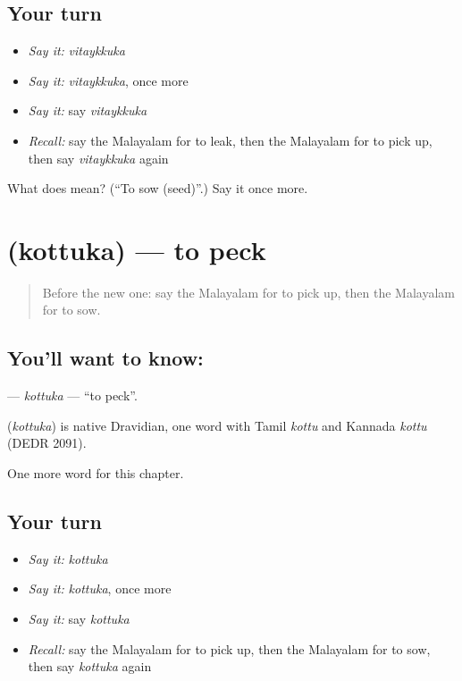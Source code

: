 \subsection*{Your turn}
\begin{itemize}
\raggedright
  \item \emph{Say it:} \emph{vitaykkuka}
  \item \emph{Say it:} \emph{vitaykkuka}, once more
  \item \emph{Say it:} say \emph{vitaykkuka}
  \item \emph{Recall:} say the Malayalam for to leak, then the Malayalam for to pick up, then say \emph{vitaykkuka} again
\end{itemize}

\begin{tcolorbox}[breakable,colback=teal!4,colframe=teal!35!black,title={Before you move on}]
What does  mean? (\textquotedblleft{}To sow (seed)\textquotedblright{}.) Say it once more.
\end{tcolorbox}
\section[\texorpdfstring{\ml{കൊത്തുക} (kottuka)}{കൊത്തുക (kottuka)}]{ (kottuka) — to peck}

\label{lesson:ML-C273-kottuka}



\begin{quote}
Before the new one: say the Malayalam for to pick up, then the Malayalam for to sow.
\end{quote}

\subsection*{You'll want to know: }
\textbf{} — \emph{kottuka} — \textquotedblleft{}to peck\textquotedblright{}.

\begin{cousinweb}
\textbf{} (\emph{kottuka}) is native Dravidian, one word with Tamil \emph{kottu} and Kannada \emph{kottu} (DEDR 2091).
\end{cousinweb}

\begin{grammarlens}[title={What you've built}]
One more word for this chapter.
\end{grammarlens}

\subsection*{Your turn}
\begin{itemize}
\raggedright
  \item \emph{Say it:} \emph{kottuka}
  \item \emph{Say it:} \emph{kottuka}, once more
  \item \emph{Say it:} say \emph{kottuka}
  \item \emph{Recall:} say the Malayalam for to pick up, then the Malayalam for to sow, then say \emph{kottuka} again
\end{itemize}

